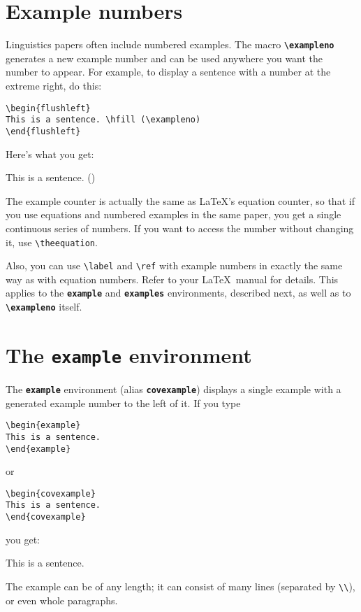 \documentclass[english]{article}
\newcommand*\jmacro[1]{\textbf{\texttt{#1}}}
\newcommand*\jenv[1]{\textbf{\texttt{#1}}}
\newcommand*\jcsmacro[1]{\jmacro{\textbackslash{#1}}}
\newcommand*\jfmacro[1]{\texttt{#1}}
\newcommand*\jfcsmacro[1]{\jfmacro{\textbackslash{#1}}}
\begin{document}
\section{Example numbers}

Linguistics papers often include numbered examples.
The macro \jcsmacro{exampleno} generates a new example number and can be 
used anywhere you want the number to appear.  For example, to display a 
sentence with a number at the extreme right, do this:
\begin{lstlisting}[moretexcs={exampleno}]
\begin{flushleft}
This is a sentence. \hfill (\exampleno)
\end{flushleft}
\end{lstlisting}
Here's what you get:
\begin{flushleft}
This is a sentence. \hfill (\exampleno)
\end{flushleft}
The example counter is actually the same as \LaTeX's equation counter, 
so that if you use equations and numbered examples in the same
paper, you get a single continuous series of numbers. If you want to 
access the number without changing it, use \jfcsmacro{theequation}.

Also, you can use \jfcsmacro{label} and \jfcsmacro{ref} with example numbers in 
exactly the same way as with equation numbers.  Refer to your \LaTeX\ manual for
details. This applies to the \jenv{example} and \jenv{examples} 
environments, described next, as well as to \jcsmacro{exampleno} itself.

\section{The \jenv{example} environment}\label{sec:ex}

The \jenv{example} environment (alias \jenv{covexample}) displays a single example
with a generated example number to the left of it.
If you type
\begin{lstlisting}
\begin{example}
This is a sentence.
\end{example}
\end{lstlisting}
or
\begin{lstlisting}
\begin{covexample}
This is a sentence.
\end{covexample}
\end{lstlisting}
you get:
\begin{example}
This is a sentence.
\end{example}
The example can be of any length; it can consist of many lines (separated by \verb"\\"), or even whole paragraphs.
\end{document}

